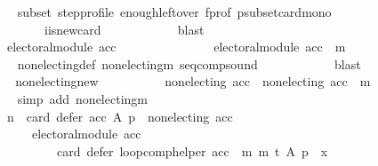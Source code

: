 \begin{isabellebody}
\ \ \ \ \ \ \ \ \ \ \isamarkupfalse%
\ subset\ step{\isacharunderscore}{\kern0pt}profile\ enough{\isacharunderscore}{\kern0pt}leftover\ f{\isacharunderscore}{\kern0pt}prof\ psubset{\isacharunderscore}{\kern0pt}card{\isacharunderscore}{\kern0pt}mono\isanewline
\ \ \ \ \ \ \ \ \ \ \ \ \ \ \ \ i{\isacharunderscore}{\kern0pt}is{\isacharunderscore}{\kern0pt}new{\isacharunderscore}{\kern0pt}card\isanewline
\ \ \ \ \ \ \ \ \ \ \isamarkupfalse%
\ blast\isanewline
\ \ \ \ \ \ \ \ \isamarkupfalse%
\ \isamarkupfalse%
\isanewline
\ \ \ \ \ \ \ \ \ \ {\isachardoublequoteopen}electoral{\isacharunderscore}{\kern0pt}module\ acc\ {\isasymlongrightarrow}\isanewline
\ \ \ \ \ \ \ \ \ \ \ \ \ \ electoral{\isacharunderscore}{\kern0pt}module\ {\isacharparenleft}{\kern0pt}acc\ {\isasymtriangleright}\ m{\isacharparenright}{\kern0pt}{\isachardoublequoteclose}\ \isanewline
\ \ \ \ \ \ \ \ \ \ \isamarkupfalse%
\ non{\isacharunderscore}{\kern0pt}electing{\isacharunderscore}{\kern0pt}def\ non{\isacharunderscore}{\kern0pt}electing{\isacharunderscore}{\kern0pt}m\ seq{\isacharunderscore}{\kern0pt}comp{\isacharunderscore}{\kern0pt}sound\isanewline
\ \ \ \ \ \ \ \ \ \ \isamarkupfalse%
\ blast\isanewline
\ \ \ \ \ \ \ \ \isamarkupfalse%
\ \isamarkupfalse%
\ non{\isacharunderscore}{\kern0pt}electing{\isacharunderscore}{\kern0pt}new{\isacharcolon}{\kern0pt}\isanewline
\ \ \ \ \ \ \ \ \ \ {\isachardoublequoteopen}non{\isacharunderscore}{\kern0pt}electing\ acc\ {\isasymlongrightarrow}\ non{\isacharunderscore}{\kern0pt}electing\ {\isacharparenleft}{\kern0pt}acc\ {\isasymtriangleright}\ m{\isacharparenright}{\kern0pt}{\isachardoublequoteclose}\isanewline
\ \ \ \ \ \ \ \ \ \ \isamarkupfalse%
\ {\isacharparenleft}{\kern0pt}simp\ add{\isacharcolon}{\kern0pt}\ non{\isacharunderscore}{\kern0pt}electing{\isacharunderscore}{\kern0pt}m{\isacharparenright}{\kern0pt}\isanewline
\ \ \ \ \ \ \ \ \isamarkupfalse%
\ \isamarkupfalse%
\isanewline
\ \ \ \ \ \ \ \ \ \ {\isachardoublequoteopen}{\isacharparenleft}{\kern0pt}n\ {\isacharequal}{\kern0pt}\ card\ {\isacharparenleft}{\kern0pt}defer\ acc\ A\ p{\isacharparenright}{\kern0pt}\ {\isasymand}\ non{\isacharunderscore}{\kern0pt}electing\ acc\ {\isasymand}\isanewline
\ \ \ \ \ \ \ \ \ \ \ \ \ \ electoral{\isacharunderscore}{\kern0pt}module\ acc{\isacharparenright}{\kern0pt}\ {\isasymlongrightarrow}\isanewline
\ \ \ \ \ \ \ \ \ \ \ \ \ \ \ \ \ \ card\ {\isacharparenleft}{\kern0pt}defer\ {\isacharparenleft}{\kern0pt}loop{\isacharunderscore}{\kern0pt}comp{\isacharunderscore}{\kern0pt}helper\ {\isacharparenleft}{\kern0pt}acc\ {\isasymtriangleright}\ m{\isacharparenright}{\kern0pt}\ m\ t{\isacharparenright}{\kern0pt}\ A\ p{\isacharparenright}{\kern0pt}\ {\isacharequal}{\kern0pt}\ x{\isachardoublequoteclose}\isanewline

\end{isabellebody}
